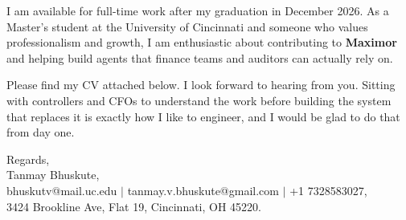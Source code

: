 \documentclass[11pt]{letter}
\begin{document}
\begin{letter}{}
I am available for full-time work after my graduation in December 2026. As a Master's student at the University of Cincinnati and someone who values professionalism and growth, I am enthusiastic about contributing to \textbf{Maximor} and helping build agents that finance teams and auditors can actually rely on.

Please find my CV attached below. I look forward to hearing from you. Sitting with controllers and CFOs to understand the work before building the system that replaces it is exactly how I like to engineer, and I would be glad to do that from day one.

{\setlength{\parskip}{0pt}
Regards,\\
Tanmay Bhuskute,\\
bhuskutv@mail.uc.edu $\mid$ tanmay.v.bhuskute@gmail.com $\mid$ +1 7328583027,\\
3424 Brookline Ave, Flat 19, Cincinnati, OH 45220.
}

\end{letter}
\end{document}
